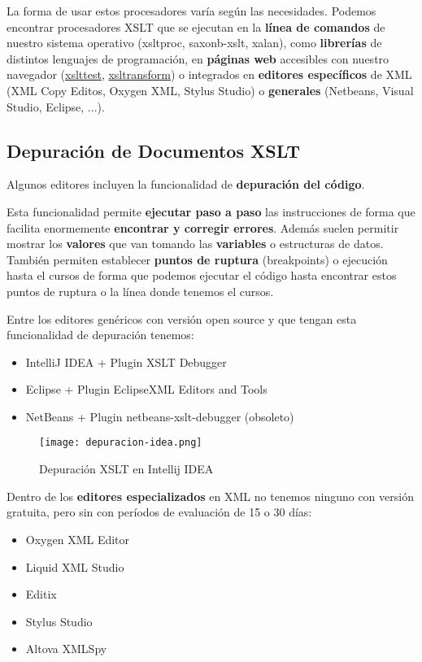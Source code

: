 La forma de usar estos procesadores varía según las necesidades. Podemos encontrar procesadores XSLT que se ejecutan en la \textbf{línea de comandos} de nuestro sistema operativo (xsltproc, saxonb-xslt, xalan), como \textbf{librerías} de distintos lenguajes de programación, en \textbf{páginas web} accesibles con nuestro navegador (\href{https://xslttest.appspot.com/}{xslttest}, \href{http://xsltransform.net/,}{xsltransform}) o integrados en \textbf{editores específicos} de XML (XML Copy Editos, Oxygen XML, Stylus Studio) o \textbf{generales} (Netbeans, Visual Studio, Eclipse, ...).

\subsection{Depuración de Documentos XSLT}

Algunos editores incluyen la funcionalidad de \textbf{depuración del código}.

Esta funcionalidad permite \textbf{ejecutar paso a paso} las instrucciones de forma que facilita enormemente \textbf{encontrar y corregir errores}. Además suelen permitir mostrar los \textbf{valores} que van tomando las \textbf{variables} o estructuras de datos. También permiten establecer \textbf{puntos de ruptura} (breakpoints) o ejecución hasta el cursos de forma que podemos ejecutar el código hasta encontrar estos puntos de ruptura o la línea donde tenemos el cursos.

Entre los editores genéricos con versión open source y que tengan esta funcionalidad de depuración tenemos:

\begin{itemize}
    \item IntelliJ IDEA + Plugin XSLT Debugger
    \item Eclipse + Plugin EclipseXML Editors and Tools
    \item NetBeans + Plugin netbeans-xslt-debugger (obsoleto)
\end{itemize}

\begin{figure}[H]
    \centering
    \texttt{[image: depuracion-idea.png]}
    \caption{Depuración XSLT en Intellij IDEA}
\end{figure}

Dentro de los \textbf{editores especializados} en XML no tenemos ninguno con versión gratuita, pero sin con períodos de evaluación de 15 o 30 días:

\begin{itemize}
    \item Oxygen XML Editor
    \item Liquid XML Studio
    \item Editix
    \item Stylus Studio
    \item Altova XMLSpy
\end{itemize}


